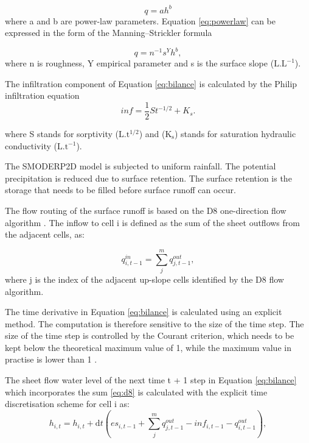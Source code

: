     \begin{equation} 
    q = ah^b
    \label{eq:powerlaw}
    \end{equation}
    where a and b are power-law parameters. Equation \ref{eq:powerlaw} can be
    expressed in the form of the Manning–Strickler formula


    \begin{equation} 
    q = n^{-1} s^Y h^b,
    \label{eq:powerlaw}
    \end{equation}
    where n is roughness,  Y  empirical parameter and s is the surface slope ($\mathrm{L.L^{-1}}$).

    The infiltration component of Equation \ref{eq:bilance} is calculated by the
    Philip infiltration equation \citep{philip1957}
    \begin{equation} 
    inf = \frac{1}{2}St^{-1/2}+K_s.
    \label{eq:infiltration}
    \end{equation} 

    where S stands for sorptivity ($\mathrm{L.t^{1/2}}$) and ($\mathrm{K_s}$)
    stands for saturation hydraulic conductivity ($\mathrm{L.t^{-1}}$).

    The SMODERP2D model is subjected to uniform rainfall. The potential
    precipitation is reduced due to surface retention. The surface retention is the
    storage that needs to be filled before surface runoff can occur. 

    The flow routing of the surface runoff is based on the D8 one-direction flow
    algorithm \cite{o1984extraction}. The inflow to cell i is defined as the sum of the sheet
    outflows from the adjacent cells, as:

    \begin{equation} 
    q^{in}_{i,t-1} = \sum_j^m q^{out}_{j,t-1}, 
    \label{eq:d8}
    \end{equation} 
    where j is the index of the adjacent up-slope cells identified by the D8 flow
    algorithm.

    The time derivative in Equation \ref{eq:bilance} is calculated using an
    explicit method. The computation is therefore sensitive to the size of the time
    step. The size of the time step is controlled by the Courant criterion, which
    needs to be kept below the theoretical maximum value of 1, while the maximum
    value in practise is lower than 1 
    \cite{zhang1989modeling, esteves2000overland}.


    The sheet flow water level of the next time t + 1 step in Equation
    \ref{eq:bilance} which incorporates the sum \ref{eq:d8} is calculated with the
    explicit time discretisation scheme for cell i as:
    \begin{equation} 
    h_{i,t} =h_{i,t} + \mathrm{d}t (es_{i,t-1} + \sum_j^m q^{out}_{j,t-1}-
    inf_{i,t-1} - q^{out}_{i,t-1}),
    \label{eq:bilance}
    \end{equation}

